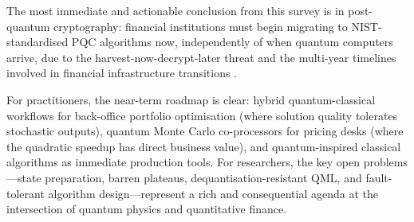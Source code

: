 \documentclass[12pt,a4paper]{article}
\begin{document}
The most immediate and actionable conclusion from this survey is in post-quantum cryptography: financial institutions must begin migrating to NIST-standardised PQC algorithms now, independently of when quantum computers arrive, due to the harvest-now-decrypt-later threat and the multi-year timelines involved in financial infrastructure transitions \citep{auer_quantum_2024}.

For practitioners, the near-term roadmap is clear: hybrid quantum-classical workflows for back-office portfolio optimisation (where solution quality tolerates stochastic outputs), quantum Monte Carlo co-processors for pricing desks (where the quadratic speedup has direct business value), and quantum-inspired classical algorithms as immediate production tools. For researchers, the key open problems---state preparation, barren plateaus, dequantisation-resistant QML, and fault-tolerant algorithm design---represent a rich and consequential agenda at the intersection of quantum physics and quantitative finance.



\end{document}
